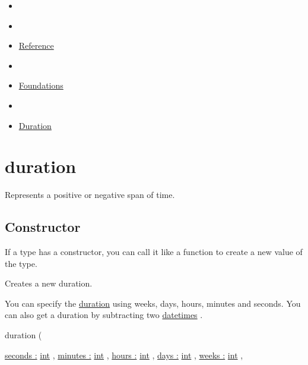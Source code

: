 \begin{itemize}
\tightlist
\item
  \href{/docs}{}
\item
  
\item
  \href{/docs/reference/}{Reference}
\item
  
\item
  \href{/docs/reference/foundations/}{Foundations}
\item
  
\item
  \href{/docs/reference/foundations/duration/}{Duration}
\end{itemize}

\section{\texorpdfstring{{ duration }}{ duration }}\label{summary}

Represents a positive or negative span of time.

\subsection{\texorpdfstring{Constructor
{}}{Constructor }}\label{constructor}

\label{constructor-constructor-tooltip}
If a type has a constructor, you can call it like a function to create a
new value of the type.

Creates a new duration.

You can specify the
\href{/docs/reference/foundations/duration/}{duration} using weeks,
days, hours, minutes and seconds. You can also get a duration by
subtracting two \href{/docs/reference/foundations/datetime/}{datetimes}
.

{ duration } (

{ \hyperref[constructor-parameters-seconds]{seconds :}
\href{/docs/reference/foundations/int/}{int} , } {
\hyperref[constructor-parameters-minutes]{minutes :}
\href{/docs/reference/foundations/int/}{int} , } {
\hyperref[constructor-parameters-hours]{hours :}
\href{/docs/reference/foundations/int/}{int} , } {
\hyperref[constructor-parameters-days]{days :}
\href{/docs/reference/foundations/int/}{int} , } {
\hyperref[constructor-parameters-weeks]{weeks :}
\href{/docs/reference/foundations/int/}{int} , }

